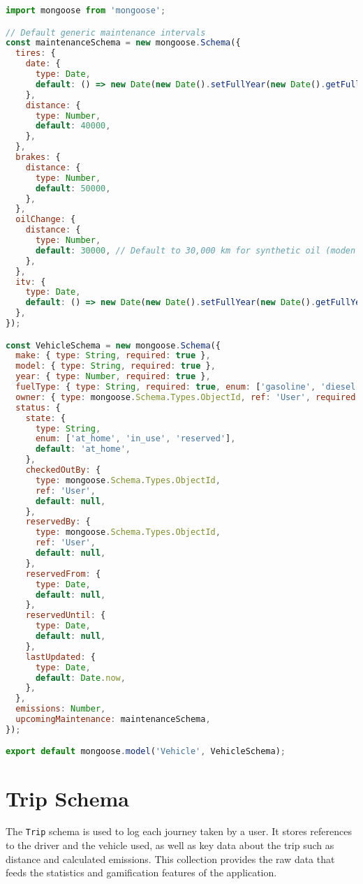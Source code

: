 \begin{lstlisting}[language=JavaScript, caption={Source code for \texttt{models/Vehicle.js}}, breaklines=true]
import mongoose from 'mongoose';

// Default generic maintenance intervals
const maintenanceSchema = new mongoose.Schema({
  tires: {
    date: {
      type: Date,
      default: () => new Date(new Date().setFullYear(new Date().getFullYear() + 1)), // One year from now
    },
    distance: {
      type: Number,
      default: 40000,
    },
  },
  brakes: {
    distance: {
      type: Number,
      default: 50000,
    },
  },
  oilChange: {
    distance: {
      type: Number,
      default: 30000, // Default to 30,000 km for synthetic oil (moden cars)
    },
  },
  itv: {
    type: Date,
    default: () => new Date(new Date().setFullYear(new Date().getFullYear() + 2)), // Two years from now
  },
});

const VehicleSchema = new mongoose.Schema({
  make: { type: String, required: true },
  model: { type: String, required: true },
  year: { type: Number, required: true },
  fuelType: { type: String, required: true, enum: ['gasoline', 'diesel', 'electric', 'hybrid'] },
  owner: { type: mongoose.Schema.Types.ObjectId, ref: 'User', required: true },
  status: {
    state: {
      type: String,
      enum: ['at_home', 'in_use', 'reserved'],
      default: 'at_home',
    },
    checkedOutBy: {
      type: mongoose.Schema.Types.ObjectId,
      ref: 'User',
      default: null,
    },
    reservedBy: {
      type: mongoose.Schema.Types.ObjectId,
      ref: 'User',
      default: null,
    },
    reservedFrom: {
      type: Date,
      default: null,
    },
    reservedUntil: {
      type: Date,
      default: null,
    },
    lastUpdated: {
      type: Date,
      default: Date.now,
    },
  },
  emissions: Number,
  upcomingMaintenance: maintenanceSchema,
});

export default mongoose.model('Vehicle', VehicleSchema);
\end{lstlisting}

\section{Trip Schema}
The \texttt{Trip} schema is used to log each journey taken by a user. It stores references to the driver and the vehicle used, as well as key data about the trip such as distance and calculated emissions. This collection provides the raw data that feeds the statistics and gamification features of the application.

